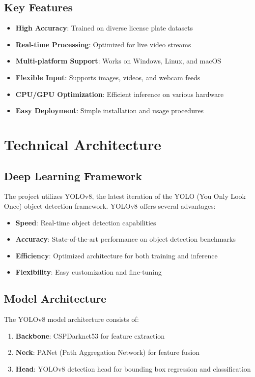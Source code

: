 \documentclass[12pt,a4paper]{article}
\begin{document}
\subsection{Key Features}
\begin{itemize}
    \item \textbf{High Accuracy}: Trained on diverse license plate datasets
    \item \textbf{Real-time Processing}: Optimized for live video streams
    \item \textbf{Multi-platform Support}: Works on Windows, Linux, and macOS
    \item \textbf{Flexible Input}: Supports images, videos, and webcam feeds
    \item \textbf{CPU/GPU Optimization}: Efficient inference on various hardware
    \item \textbf{Easy Deployment}: Simple installation and usage procedures
\end{itemize}

\section{Technical Architecture}

\subsection{Deep Learning Framework}
The project utilizes YOLOv8, the latest iteration of the YOLO (You Only Look Once) object detection framework. YOLOv8 offers several advantages:

\begin{itemize}
    \item \textbf{Speed}: Real-time object detection capabilities
    \item \textbf{Accuracy}: State-of-the-art performance on object detection benchmarks
    \item \textbf{Efficiency}: Optimized architecture for both training and inference
    \item \textbf{Flexibility}: Easy customization and fine-tuning
\end{itemize}

\subsection{Model Architecture}
The YOLOv8 model architecture consists of:

\begin{enumerate}
    \item \textbf{Backbone}: CSPDarknet53 for feature extraction
    \item \textbf{Neck}: PANet (Path Aggregation Network) for feature fusion
    \item \textbf{Head}: YOLOv8 detection head for bounding box regression and classification
\end{enumerate}
\end{document}
